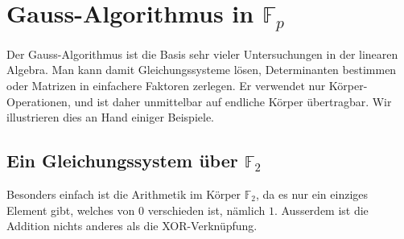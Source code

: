 %
%
%
\section{Gauss-Algorithmus in $\mathbb F_p$}
Der Gauss-Algorithmus ist die Basis sehr vieler Untersuchungen in der
linearen Algebra.
Man kann damit Gleichungssysteme lösen, Determinanten bestimmen oder
Matrizen in einfachere Faktoren zerlegen.
Er verwendet nur Körper-Operationen, und ist daher unmittelbar
auf endliche Körper übertragbar.
Wir illustrieren dies an Hand einiger Beispiele.

\subsection{Ein Gleichungssystem über $\mathbb F_2$}
Besonders einfach ist die Arithmetik im Körper $\mathbb F_2$,
da es nur ein einziges Element gibt, welches von $0$ verschieden ist,
nämlich $1$.
Ausserdem ist die Addition nichts anderes als die XOR-Verknüpfung.

